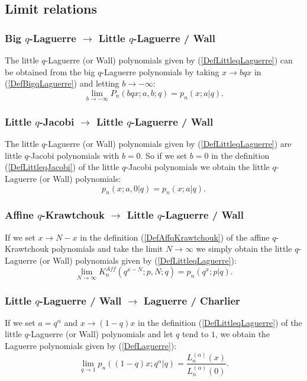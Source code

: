 \documentclass[envcountchap,graybox]{svmono}
\newcounter{rom}
\begin{document}
{{\subsection*{Limit relations}

\subsubsection*{Big $q$-Laguerre $\rightarrow$ Little $q$-Laguerre / Wall}
The little $q$-Laguerre (or Wall) polynomials given by (\ref{DefLittleqLaguerre})
can be obtained from the big $q$-Laguerre polynomials by taking $x\rightarrow bqx$
in (\ref{DefBigqLaguerre}) and letting $b\rightarrow -\infty$:
$$\lim_{b\rightarrow -\infty}P_n(bqx;a,b;q)=p_n(x;a|q).$$

\subsubsection*{Little $q$-Jacobi $\rightarrow$ Little $q$-Laguerre / Wall}
The little $q$-Laguerre (or Wall) polynomials given by (\ref{DefLittleqLaguerre})
are little $q$-Jacobi polynomials with $b=0$. So if we set $b=0$ in the
definition (\ref{DefLittleqJacobi}) of the little $q$-Jacobi polynomials we
obtain the little $q$-Laguerre (or Wall) polynomials:
$$p_n(x;a,0|q)=p_n(x;a|q).$$

\subsubsection*{Affine $q$-Krawtchouk $\rightarrow$ Little $q$-Laguerre / Wall}
If we set $x\rightarrow N-x$ in the definition (\ref{DefAffqKrawtchouk})
of the affine $q$-Krawtchouk polynomials and take the limit
$N\rightarrow\infty$ we simply obtain the little $q$-Laguerre (or Wall)
polynomials given by (\ref{DefLittleqLaguerre}):
$$\lim_{N\rightarrow\infty}K_n^{Aff}(q^{x-N};p,N;q)=p_n(q^x;p|q).$$

\subsubsection*{Little $q$-Laguerre / Wall $\rightarrow$ Laguerre / Charlier}
If we set $a=q^{\alpha}$ and $x\rightarrow (1-q)x$ in the definition (\ref{DefLittleqLaguerre})
of the little $q$-Laguerre (or Wall) polynomials and let $q$ tend to $1$, we obtain
the Laguerre polynomials given by (\ref{DefLaguerre}):
\begin{equation}
\lim_{q\rightarrow 1}p_n((1-q)x;q^{\alpha}|q)=\frac{L_n^{(\alpha)}(x)}{L_n^{(\alpha)}(0)}.
\end{equation}

}}
\end{document}
